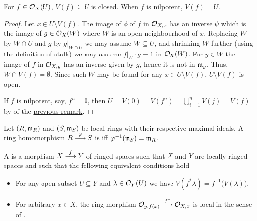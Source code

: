 \documentclass[a4paper,parskip=half,numbers=enddot, DIV=12]{scrreprt}
\begin{document}
\begin{fact}
    For $f\in\mathcal{O}_X(U)$, $V(f)\subseteq U$ is closed. When $f$ is nilpotent, $V(f) = U$.
\end{fact}
\begin{proof}
    Let $x\in U\setminus V(f)$. The image of $\phi$ of $f$ in $\mathcal{O}_{X,x}$ has an inverse $\psi$ which is the image of $g\in \mathcal{O}_X(W)$ where $W$ is an open neighbourhood of $x$. Replacing $W$ by $W\cap U$ and $g$ by $g|_{W\cap U}$  we may assume $W\subseteq U$, and shrinking $W$ further (using the definition of stalk) we may assume $f|_W\cdot g = 1$ in $\mathcal{O}_X(W)$. For $y\in W$ the image of $f$ in $\mathcal{O}_{X,y}$ has an inverse given by $g$, hence it is not in $\mathfrak{m}_y$. Thus, $W\cap V(f) = \emptyset$. Since such $W$ may be found for any $x\in U\setminus V(f)$, $U\setminus V(f)$ is open.
    
    If $f$ is nilpotent, say, $f^n=0$, then $U=V(0)=V(f^n)=\bigcup_{i=1}^nV(f)=V(f)$ by  of the \hyperref[rem:stuffAboutV(f)]{previous remark}.
\end{proof}
\begin{defi}
    \begin{alphanumerate}
        \item {}
            Let $(R,\mathfrak{m}_R)$ and $(S,\mathfrak{m}_S)$ be local rings with their respective maximal ideals. A ring homomorphism $R\morphism[\phi] S$ is  iff $\varphi^{-1}(\mathfrak{m}_S) = \mathfrak{m}_R$.
        \item 
            A  is a morphism $X\morphism[f] Y$ of ringed spaces such that $X$ and $Y$ are locally ringed spaces and such that the following equivalent conditions hold
            \begin{itemize}
              \item[\itememph{\alpha}]
                For any open subset $U\subseteq Y$ and $\lambda\in \mathcal{O}_Y(U)$ we have $V(f^*\lambda) = f^{-1}\big(V(\lambda)\big)$.
              \item[\itememph{\beta}]
                For arbitrary $x\in X$, the ring morphism $\Oo_{y,f(x)} \morphism[f^*]\Oo_{X,x}$ is local in the sense of .
            \end{itemize}

    \end{alphanumerate}
\end{defi}
\end{document}
